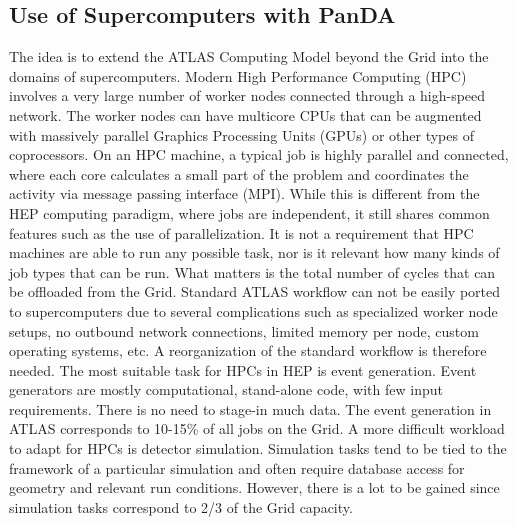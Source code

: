 \documentclass[10pt, conference, compsocconf]{IEEEtran}
\begin{document}
\subsection{Use of Supercomputers with PanDA}
The idea is to extend the ATLAS Computing Model beyond the Grid into the domains of supercomputers. Modern High Performance Computing  (HPC) involves  a very large number of worker nodes  connected  through a  high-speed   network. The worker nodes can have  multicore CPUs that can be augmented with massively parallel Graphics Processing Units (GPUs) or other types of coprocessors. On an HPC machine, a  typical job is highly parallel and connected,  where each core calculates  a small part of the problem and coordinates the activity via message passing interface (MPI). While this is different from the HEP computing paradigm, where jobs are independent, it still shares common  features  such as the use of parallelization. It is not a requirement  that HPC machines are able to run any possible task, nor is it relevant how many kinds of job types that can be run. What matters is the total number of cycles that can be offloaded from the Grid. Standard  ATLAS  workflow  can not be easily ported to supercomputers   due  to   several   complications such  as specialized worker  node  setups, no  outbound network connections,  limited memory per node, custom operating systems,  etc. A reorganization  of the standard  workflow is therefore needed.
The most suitable task for HPCs in HEP is event generation. Event generators are mostly computational,  stand-alone code, with few input requirements.  There is no need  to stage-in much data. The event generation  in ATLAS corresponds  to
10-15\% of all jobs on the Grid. A more difficult workload to adapt  for HPCs is detector  simulation. Simulation tasks tend to be tied to the framework of a particular simulation and often require  database access for geometry and relevant run conditions.  However,  there is a  lot to be gained  since simulation  tasks correspond to 2/3 of the Grid capacity.
\end{document}
